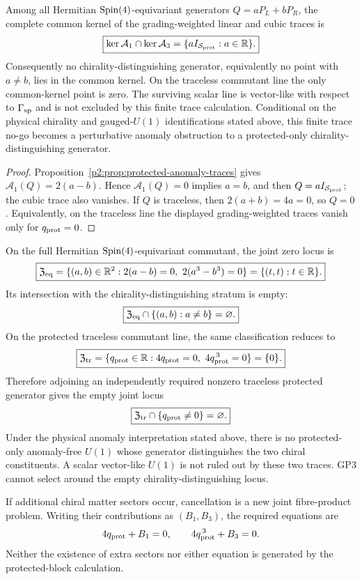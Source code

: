 \documentclass[12pt,a4paper]{article}
\begin{document}
\begin{theorem}
\label{p2:thm:protected-anomaly-no-go}
Among all Hermitian \(\mathrm{Spin}(4)\)-equivariant generators \(Q=aP_L+bP_R\), the complete
common kernel of the grading-weighted linear and cubic traces is
\[
 \boxed{
 \ker\mathcal A_1\cap\ker\mathcal A_3
 =\{aI_{\mathcal S_{\rm prot}}:a\in\mathbb R\}.}
\]
Consequently no chirality-distinguishing generator, equivalently no point with
\(a\ne b\), lies in the common kernel.  On the traceless commutant line the
only common-kernel point is zero.  The surviving scalar line is vector-like
with respect to \(\Gamma_{\rm sp}\) and is not excluded by this finite trace
calculation.
Conditional on the physical chirality and gauged-\(U(1)\) identifications
stated above, this finite trace no-go becomes a perturbative anomaly
obstruction to a protected-only chirality-distinguishing generator.
\end{theorem}

\begin{proof}
Proposition~\ref{p2:prop:protected-anomaly-traces} gives
\(\mathcal A_1(Q)=2(a-b)\).  Hence
\(\mathcal A_1(Q)=0\) implies \(a=b\), and then \(Q=aI_{\mathcal S_{\rm prot}}\);
the cubic trace also vanishes.  If \(Q\) is traceless, then
\(2(a+b)=4a=0\), so \(Q=0\).  Equivalently, on the traceless line the
displayed grading-weighted traces vanish only for \(q_{\rm prot}=0\).
\end{proof}

\begin{corollary}
\label{p2e:cor:protected-anomaly-free-joint-locus}
On the full Hermitian \(\mathrm{Spin}(4)\)-equivariant commutant, the joint zero locus is
\[
 \boxed{
 \mathfrak Z_{\rm eq}
 =\{(a,b)\in\mathbb R^2:
      2(a-b)=0,\ 2(a^3-b^3)=0\}
 =\{(t,t):t\in\mathbb R\}.}
\]
Its intersection with the chirality-distinguishing stratum is empty:
\[
 \boxed{\mathfrak Z_{\rm eq}\cap\{(a,b):a\ne b\}=\varnothing.}
\]
On the protected traceless commutant line, the same classification reduces to
\[
 \boxed{
 \mathfrak Z_{\rm tr}
 =\{q_{\rm prot}\in\mathbb R:
     4q_{\rm prot}=0,\ 4q_{\rm prot}^{\,3}=0\}
 =\{0\}.}
\]
Therefore adjoining an independently required nonzero traceless protected
generator gives the empty joint locus
\[
 \boxed{\mathfrak Z_{\rm tr}\cap
        \{q_{\rm prot}\neq0\}=\varnothing.}
\]
Under the physical anomaly interpretation stated above, there is no
protected-only anomaly-free \(U(1)\) whose generator distinguishes the two
chiral constituents.  A scalar vector-like \(U(1)\) is not ruled out by these
two traces.  GP3 cannot select around the empty chirality-distinguishing locus.

If additional chiral matter sectors occur, cancellation is a new joint
fibre-product problem.  Writing their contributions as
\((B_1,B_3)\), the required equations are
\[
 4q_{\rm prot}+B_1=0,
 \qquad
 4q_{\rm prot}^{\,3}+B_3=0.
\]
Neither the existence of extra sectors nor either equation is generated by
the protected-block calculation.
\end{corollary}
\end{document}
